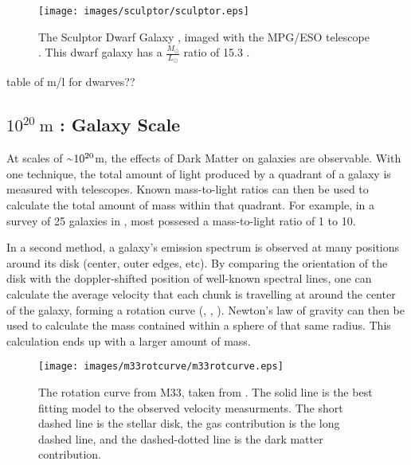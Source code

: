     \begin{figure}[ht]
      \texttt{[image: images/sculptor/sculptor.eps]}
      \caption[Sculptor Dwarf Galaxy]{
        The Sculptor Dwarf Galaxy \cite{sculptor_image}, imaged with the MPG/ESO telescope \cite{sculptor_paper}.
        This dwarf galaxy has a $\frac{M_\odot}{L_\odot}$ ratio of 15.3 \cite{sculptor_ml}.
      }
      \label{fig:sculptor}
    \end{figure}
    
    {\color{red}table of m/l for dwarves??}
    
    \FloatBarrier
    

  \subsection{$10^{20}\:\text{m}$ : Galaxy Scale}
    At scales of $\nicetilde 10^{20}$m, the effects of Dark Matter on galaxies are observable.
    With one technique, the total amount of light produced by a quadrant of a galaxy is measured with telescopes.
    Known mass-to-light ratios can then be used to calculate the total amount of mass within that quadrant.
    For example, in a survey of 25 galaxies in \cite{galaxy_mass_light_ratio}, most possesed a mass-to-light ratio of 1 to 10.

    In a second method, a galaxy's emission spectrum is observed at many positions around its disk (center, outer edges, etc).
    By comparing the orientation of the disk with the doppler-shifted position of well-known spectral lines, one can calculate the average velocity that each chunk is travelling at around the center of the galaxy, forming a rotation curve (\cite{rotation_curve_review}, \cite{spiral_galaxy_rot_curve}, \cite{milkyway_dm_evidence}).
    Newton's law of gravity can then be used to calculate the mass contained within a sphere of that same radius.
    This calculation ends up with a larger amount of mass.
    
    \begin{figure}[ht]
      \texttt{[image: images/m33rotcurve/m33rotcurve.eps]}
      \caption[M33 Rotation Curve]{
        The rotation curve from M33, taken from \cite{m33rotcurve}.
        The solid line is the best fitting model to the observed velocity measurments.
        The short dashed line is the stellar disk, the gas contribution is the long dashed line, and the dashed-dotted line is the dark matter contribution.
      }
      \label{fig:m33rotcurve}
    \end{figure}
    

